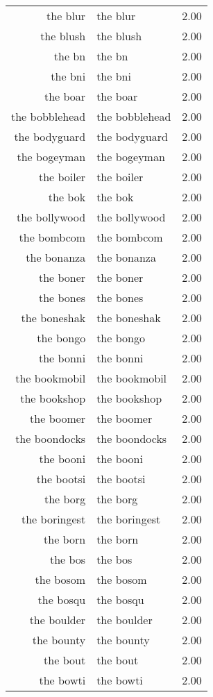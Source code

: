 \begin{table}[ht]
\begin{tabular}{rlr}
  the blur & the blur & 2.00 \\ 
  the blush & the blush & 2.00 \\ 
  the bn & the bn & 2.00 \\ 
  the bni & the bni & 2.00 \\ 
  the boar & the boar & 2.00 \\ 
  the bobblehead & the bobblehead & 2.00 \\ 
  the bodyguard & the bodyguard & 2.00 \\ 
  the bogeyman & the bogeyman & 2.00 \\ 
  the boiler & the boiler & 2.00 \\ 
  the bok & the bok & 2.00 \\ 
  the bollywood & the bollywood & 2.00 \\ 
  the bombcom & the bombcom & 2.00 \\ 
  the bonanza & the bonanza & 2.00 \\ 
  the boner & the boner & 2.00 \\ 
  the bones & the bones & 2.00 \\ 
  the boneshak & the boneshak & 2.00 \\ 
  the bongo & the bongo & 2.00 \\ 
  the bonni & the bonni & 2.00 \\ 
  the bookmobil & the bookmobil & 2.00 \\ 
  the bookshop & the bookshop & 2.00 \\ 
  the boomer & the boomer & 2.00 \\ 
  the boondocks & the boondocks & 2.00 \\ 
  the booni & the booni & 2.00 \\ 
  the bootsi & the bootsi & 2.00 \\ 
  the borg & the borg & 2.00 \\ 
  the boringest & the boringest & 2.00 \\ 
  the born & the born & 2.00 \\ 
  the bos & the bos & 2.00 \\ 
  the bosom & the bosom & 2.00 \\ 
  the bosqu & the bosqu & 2.00 \\ 
  the boulder & the boulder & 2.00 \\ 
  the bounty & the bounty & 2.00 \\ 
  the bout & the bout & 2.00 \\ 
  the bowti & the bowti & 2.00 \\ 

\end{tabular}
\end{table}

